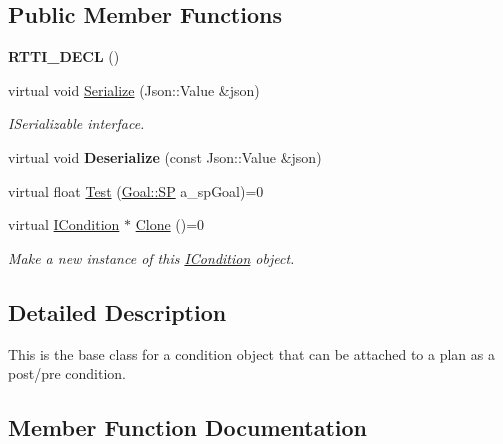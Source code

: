 \subsection*{Public Member Functions}
\begin{DoxyCompactItemize}
\item 
\mbox{\label{class_i_condition_a8b4e9346b00705e620405664b181b1c3}} 
{\bfseries R\+T\+T\+I\+\_\+\+D\+E\+CL} ()
\item 
\mbox{\label{class_i_condition_ac4a2fbb08d45c0b8ced21cb604ef6aca}} 
virtual void \hyperlink{class_i_condition_ac4a2fbb08d45c0b8ced21cb604ef6aca}{Serialize} (Json\+::\+Value \&json)
\begin{DoxyCompactList}\small\item\em I\+Serializable interface. \end{DoxyCompactList}\item 
\mbox{\label{class_i_condition_abd31c8f4279c3a468e733fe26321db7a}} 
virtual void {\bfseries Deserialize} (const Json\+::\+Value \&json)
\item 
virtual float \hyperlink{class_i_condition_ad298529632d4e5069b2302ee6731cbb9}{Test} (\hyperlink{class_goal_a818ae12a4d1f28bd433dab2a830a390e}{Goal\+::\+SP} a\+\_\+sp\+Goal)=0
\item 
\mbox{\label{class_i_condition_aa3db61d9ec30d302ff791ae5df740e9b}} 
virtual \hyperlink{class_i_condition}{I\+Condition} $\ast$ \hyperlink{class_i_condition_aa3db61d9ec30d302ff791ae5df740e9b}{Clone} ()=0
\begin{DoxyCompactList}\small\item\em Make a new instance of this \hyperlink{class_i_condition}{I\+Condition} object. \end{DoxyCompactList}\end{DoxyCompactItemize}


\subsection{Detailed Description}
This is the base class for a condition object that can be attached to a plan as a post/pre condition. 

\subsection{Member Function Documentation}
\mbox{\label{class_i_condition_ad298529632d4e5069b2302ee6731cbb9}} 
